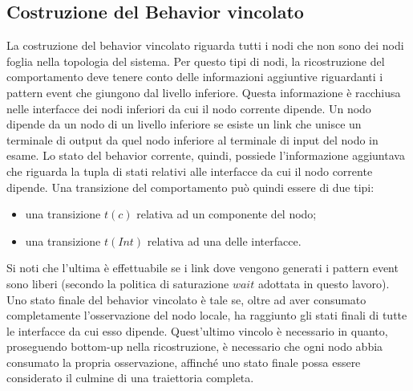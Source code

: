 \subsection{Costruzione del Behavior vincolato}
La costruzione del behavior vincolato riguarda tutti i nodi che non sono dei nodi foglia nella topologia del sistema. Per questo tipi di nodi, la ricostruzione del comportamento deve tenere conto delle informazioni aggiuntive riguardanti i pattern event che giungono dal livello inferiore. Questa informazione è racchiusa nelle interfacce dei nodi inferiori da cui il nodo corrente dipende. Un nodo dipende da un nodo di un livello inferiore se esiste un link che unisce un terminale di output da quel nodo inferiore al terminale di input del nodo in esame. Lo stato del behavior corrente, quindi, possiede l'informazione aggiuntava che riguarda la tupla di stati relativi alle interfacce da cui il nodo corrente dipende. Una transizione del comportamento può quindi essere di due tipi:
\begin{itemize}
\item una transizione $t(c)$ relativa ad un componente del nodo;
\item una transizione $t(Int)$ relativa ad una delle interfacce.
\end{itemize} 
Si noti che l'ultima è effettuabile se i link dove vengono generati i pattern event sono liberi (secondo la politica di saturazione $wait$ adottata in questo lavoro).
Uno stato finale del behavior vincolato è tale se, oltre ad aver consumato completamente l'osservazione del nodo locale, ha raggiunto gli stati finali di tutte le interfacce da cui esso dipende. Quest'ultimo vincolo è necessario in quanto, proseguendo bottom-up nella ricostruzione, è necessario che ogni nodo abbia consumato la propria osservazione, affinché uno stato finale possa essere considerato il culmine di una traiettoria completa.

